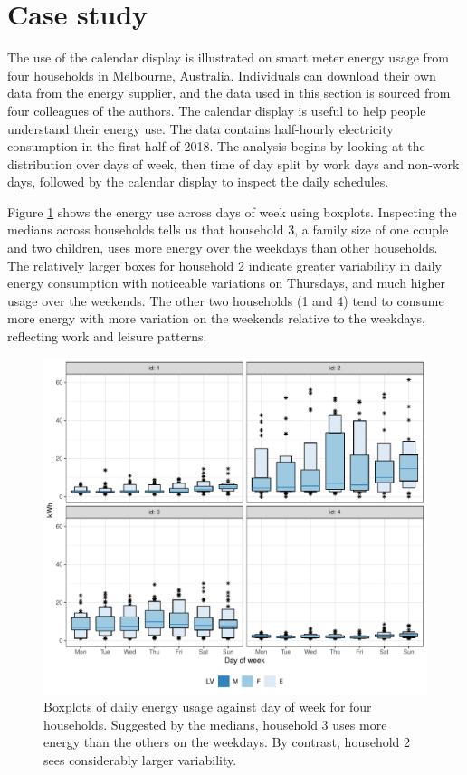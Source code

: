 \documentclass[12pt]{article}
\begin{document}
\newpage

\hypertarget{sec:case}{%
\section{Case study}\label{sec:case}}

The use of the calendar display is illustrated on smart meter energy usage from four households in Melbourne, Australia. Individuals can download their own data from the energy supplier, and the data used in this section is sourced from four colleagues of the authors. The calendar display is useful to help people understand their energy use. The data contains half-hourly electricity consumption in the first half of 2018. The analysis begins by looking at the distribution over days of week, then time of day split by work days and non-work days, followed by the calendar display to inspect the daily schedules.

Figure \ref{fig:dow} shows the energy use across days of week using boxplots. Inspecting the medians across households tells us that household 3, a family size of one couple and two children, uses more energy over the weekdays than other households. The relatively larger boxes for household 2 indicate greater variability in daily energy consumption with noticeable variations on Thursdays, and much higher usage over the weekends. The other two households (1 and 4) tend to consume more energy with more variation on the weekends relative to the weekdays, reflecting work and leisure patterns.

\begin{figure}

{\centering \includegraphics[width=\textwidth]{figure/dow-1} 

}

\caption{Boxplots of daily energy usage against day of week for four households. Suggested by the medians, household 3 uses more energy than the others on the weekdays. By contrast, household 2 sees considerably larger variability.}\label{fig:dow}
\end{figure}
\end{document}
